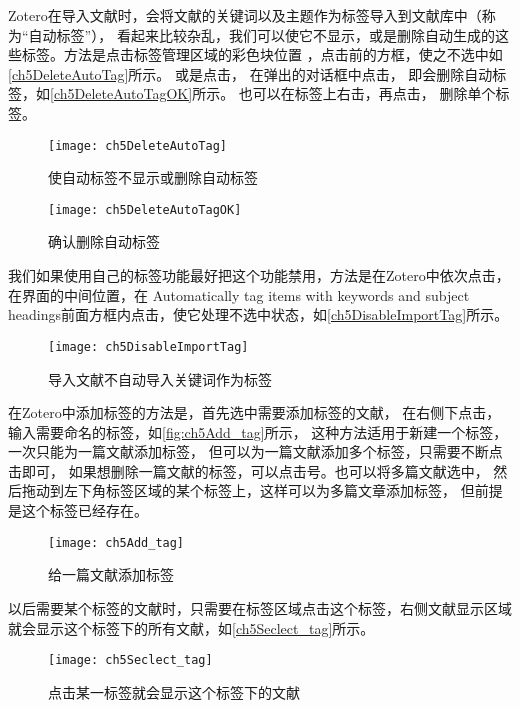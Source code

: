 \documentclass[cn,11pt,chinese]{elegantbook}
\begin{document}
			Zotero在导入文献时，会将文献的关键词以及主题作为标签导入到文献库中（称为“自动标签”），
			看起来比较杂乱，我们可以使它不显示，或是删除自动生成的这些标签。方法是点击标签管理区域的彩色块位置
			，点击前的方框，使之不选中如\autoref{ch5DeleteAutoTag}所示。
			或是点击，
			在弹出的对话框中点击，
			即会删除自动标签，如\autoref{ch5DeleteAutoTagOK}所示。
			也可以在标签上右击，再点击，
			删除单个标签。
			
				\begin{figure}[htbp]
					\centering
					\texttt{[image: ch5DeleteAutoTag]}
					\caption{使自动标签不显示或删除自动标签}
					\label{ch5DeleteAutoTag}
				\end{figure}
				\begin{figure}[htbp]
					\centering
					\texttt{[image: ch5DeleteAutoTagOK]}
					\caption{确认删除自动标签}
					\label{ch5DeleteAutoTagOK}
				\end{figure}
			
			我们如果使用自己的标签功能最好把这个功能禁用，方法是在Zotero中依次点击，在界面的中间位置，在
			Automatically tag items with keywords and subject headings前面方框内点击，使它处理不选中状态，如\autoref{ch5DisableImportTag}所示。
				\begin{figure}[htbp]
					\centering
					\texttt{[image: ch5DisableImportTag]}
					\caption{导入文献不自动导入关键词作为标签}
					\label{ch5DisableImportTag}
				\end{figure}
						
			在Zotero中添加标签的方法是，首先选中需要添加标签的文献，
			在右侧下点击，
			输入需要命名的标签，如\autoref{fig:ch5Add_tag}所示，
			这种方法适用于新建一个标签，一次只能为一篇文献添加标签，
			但可以为一篇文献添加多个标签，只需要不断点击即可，
			如果想删除一篇文献的标签，可以点击\menu[,]{-}号。也可以将多篇文献选中，
			然后拖动到左下角标签区域的某个标签上，这样可以为多篇文章添加标签，
			但前提是这个标签已经存在。
				\begin{figure}[htbp]
					\centering
					\texttt{[image: ch5Add\_tag]}
					\caption{给一篇文献添加标签}
					\label{fig:ch5Add_tag}
				\end{figure}
			
			以后需要某个标签的文献时，只需要在标签区域点击这个标签，右侧文献显示区域就会显示这个标签下的所有文献，如\autoref{ch5Seclect_tag}所示。
				\begin{figure}[htbp]
					\centering
					\texttt{[image: ch5Seclect\_tag]}
					\caption{点击某一标签就会显示这个标签下的文献}
					\label{ch5Seclect_tag}
				\end{figure}
			
\end{document}
